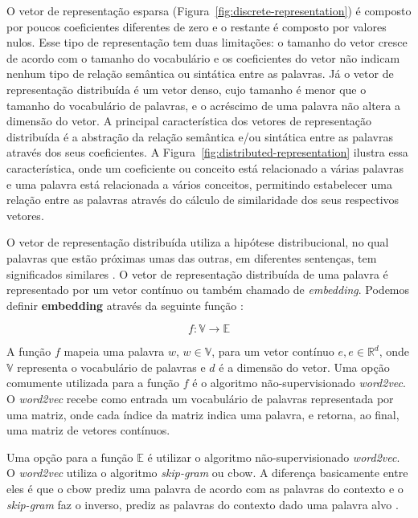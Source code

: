 O vetor de representação esparsa (Figura~\ref{fig:discrete-representation}) é composto por poucos coeficientes diferentes de zero e o restante é composto por valores nulos. Esse tipo de representação tem duas limitações: o tamanho do vetor cresce de acordo com o tamanho do vocabulário e os coeficientes do vetor não indicam nenhum tipo de relação semântica ou sintática entre as palavras. Já o vetor de representação distribuída é um vetor denso, cujo tamanho é menor que o tamanho do vocabulário de palavras, e o acréscimo de uma palavra não altera a dimensão do vetor. A principal característica dos vetores de representação distribuída é a abstração da relação semântica e/ou sintática entre as palavras através dos seus coeficientes. A Figura~\ref{fig:distributed-representation} ilustra essa característica, onde um coeficiente ou conceito está relacionado a várias palavras e uma palavra está relacionada a vários conceitos, permitindo estabelecer uma relação entre as palavras através do cálculo de similaridade dos seus respectivos vetores.

 O vetor de representação distribuída utiliza a hipótese distribucional, no qual palavras que estão próximas umas das outras, em diferentes sentenças, tem significados similares \citep{Goodfellow-et-al-2016}. O vetor de representação distribuída de uma palavra é representado por um vetor contínuo ou também chamado de \textit{embedding}. Podemos definir \textbf{embedding} através da seguinte função \citep{cambronero-deep-learning-code-search:2019}:

\begin{equation}
    f: \mathbb{V} \rightarrow \mathbb{E}
\end{equation}

A função $f$ mapeia uma palavra $w$, $w \in \mathbb{V}$, para um vetor contínuo $e, e \in \mathbb{R}^{d}$, onde $\mathbb{V}$ representa o vocabulário de palavras e $d$ é a dimensão do vetor. Uma opção comumente utilizada para a função $f$ é o algoritmo não-supervisionado \textit{word2vec}. O \textit{word2vec} recebe como entrada um vocabulário de palavras representada por uma matriz, onde cada índice da matriz indica uma palavra, e retorna, ao final, uma matriz de vetores contínuos. 
 
 
 
 
 Uma opção para a função $\mathbb{E}$ é utilizar o algoritmo não-supervisionado \textit{word2vec}. O \textit{word2vec} utiliza o algoritmo \textit{skip-gram} ou \acrshort{cbow}. A diferença basicamente entre eles é que o \acrshort{cbow} prediz uma palavra de acordo com as palavras do contexto e o \textit{skip-gram} faz o inverso, prediz as palavras do contexto dado uma palavra alvo \citep{mikolov2013distributed}.




